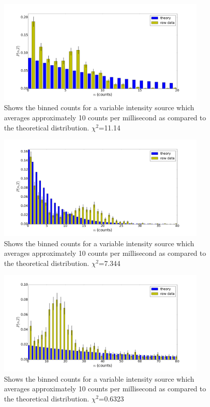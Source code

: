 \documentclass[prb,preprint]{revtex4-1}
\begin{document}
\begin{figure}[h]
\centering
\includegraphics[width=0.9\textwidth]{1k.png}
\caption{Shows the binned counts for a variable intensity source which averages approximately 10 counts per millisecond as compared to the theoretical distribution. $\chi^2$=11.14}
\label{LC2}
\end{figure}

\newpage

\begin{figure}[h]
\centering
\includegraphics[width=0.9\textwidth]{3k.png}
\caption{Shows the binned counts for a variable intensity source which averages approximately 10 counts per millisecond as compared to the theoretical distribution. $\chi^2$=7.344}
\label{LC2}
\end{figure}

\begin{figure}[h]
\centering
\includegraphics[width=0.9\textwidth]{10k.png}
\caption{Shows the binned counts for a variable intensity source which averages approximately 10 counts per millisecond as compared to the theoretical distribution. $\chi^2$=0.6323}
\label{LC2}
\end{figure}
\end{document}
